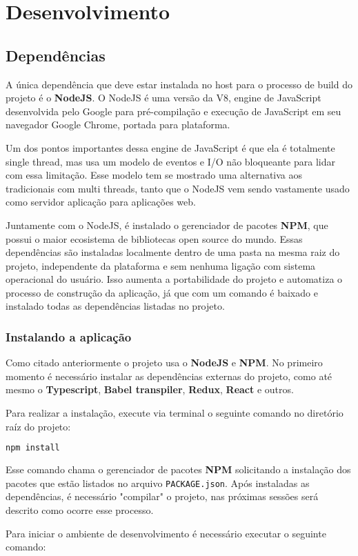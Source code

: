\documentclass[rel_mlp]{iiufrgs}
\begin{document}
\chapter{Desenvolvimento}


\section{Dependências}
A única dependência que deve estar instalada no host para o processo de build do projeto é o \textbf{NodeJS}.
O NodeJS é uma versão da V8, engine de JavaScript desenvolvida pelo Google para pré-compilação e execução de
JavaScript em seu navegador Google Chrome, portada para plataforma. \par
Um dos pontos importantes dessa engine de JavaScript é que ela é totalmente single thread, mas usa um modelo de eventos e I/O não bloqueante para lidar com essa limitação. Esse modelo tem se mostrado uma alternativa aos tradicionais com multi threads, tanto que o NodeJS vem sendo vastamente usado como servidor aplicação para aplicações web. \par
Juntamente com o NodeJS, é instalado o gerenciador de pacotes \textbf{NPM}, que possui o maior ecosistema de bibliotecas open source do mundo.
Essas dependências são instaladas localmente dentro de uma pasta na mesma raiz do projeto, independente da plataforma e sem nenhuma ligação com sistema operacional do usuário. Isso aumenta a portabilidade do projeto e automatiza o processo de construção da aplicação, já que com um comando é baixado e instalado todas as dependências listadas no projeto.

\subsection{Instalando a aplicação}
Como citado anteriormente o projeto usa o \textbf{NodeJS} e \textbf{NPM}. No primeiro momento é necessário instalar as dependências externas do projeto, como até mesmo o \textbf{Typescript}, \textbf{Babel transpiler}, \textbf{Redux}, \textbf{React} e outros. \par
Para realizar a instalação, execute via terminal o seguinte comando no diretório raíz do projeto:

\begin{lstlisting}[language=JavaScript]
  npm install
\end{lstlisting}

Esse comando chama o gerenciador de pacotes \textbf{NPM} solicitando a instalação dos pacotes que estão listados no arquivo \verb|PACKAGE.json|. Após instaladas as dependências, é necessário "compilar" o projeto, nas próximas sessões será descrito como ocorre esse processo. \par
Para iniciar o ambiente de desenvolvimento é necessário executar o seguinte comando:
\end{document}
